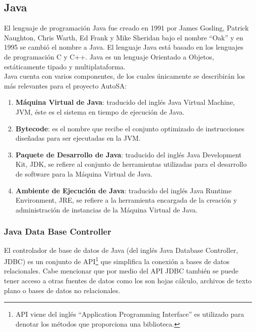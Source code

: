 \subsection{Java}\label{sec:java}

El lenguaje de programación Java fue creado en 1991 por James Gosling, Patrick Naughton, Chris Warth, Ed Frank y Mike Sheridan bajo el nombre ``Oak'' y en 1995 se cambió el nombre a Java. El lenguaje Java está basado en los lenguajes de programación C y C++. Java es un lenguaje Orientado a Objetos, estáticamente tipado y multiplataforma\cite{JavaCompleteReference, WellGroundedJavaDeveloper}.\\
Java cuenta con varios componentes, de los cuales únicamente se describirán los más relevantes para el proyecto AutoSA\cite{JavaCompleteReference, WellGroundedJavaDeveloper}:
\begin{enumerate}
	\item \textbf{Máquina Virtual de Java}: traducido del inglés Java Virtual Machine, JVM, éste es el sistema en tiempo de ejecución de Java.
	\item \textbf{Bytecode}: es el nombre que recibe el conjunto optimizado de instrucciones diseñadas para ser ejecutadas en la JVM.
	\item \textbf{Paquete de Desarrollo de Java}: traducido del inglés Java Development Kit, JDK, se refiere al conjunto de herramientas utilizadas para el desarrollo de software para la Máquina Virtual de Java.
	\item \textbf{Ambiente de Ejecución de Java}: traducido del inglés Java Runtime Environment, JRE, se refiere a la herramienta encargada de la creación y administración de instancias de la Máquina Virtual de Java.
\end{enumerate}

\subsubsection{Java Data Base Controller}\label{sec:jdbc}
El controlador de base de datos de Java (del inglés Java Database Controller, JDBC) es un conjunto de API\footnote{API viene del inglés ``Application Programming Interface'' es utilizado para denotar los métodos que proporciona una biblioteca.} que simplifica la conexión a bases de datos relacionales. Cabe mencionar que por medio del API JDBC también se puede tener acceso a otras fuentes de datos como los son hojas cálculo, archivos de texto plano o bases de datos no relacionales\cite{JDBCRecipes, BeginingJava8APIs}.

